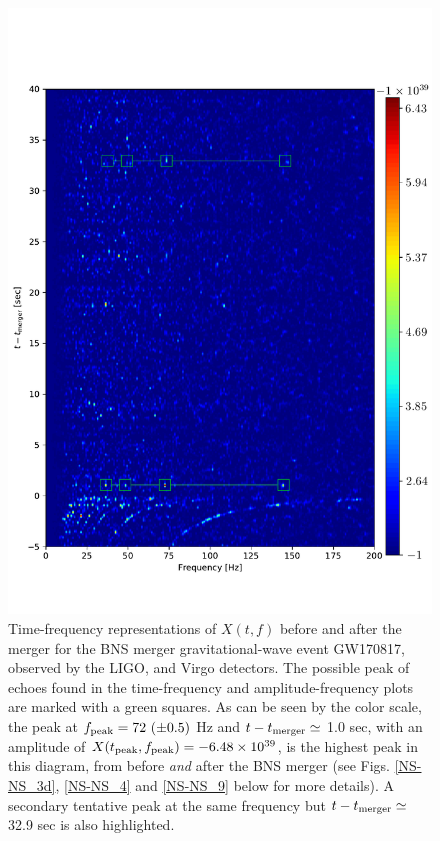 \documentclass[12pt]{article}
\begin{document}
\begin{figure}[!tbp]
    \includegraphics[width=\textwidth]{spectrogram_color.pdf}
 \caption{Time-frequency representations of $X(t,f)$ before and after the merger for the BNS merger gravitational-wave event GW170817, observed by the LIGO, and Virgo detectors. The possible peak of echoes found in the time-frequency and amplitude-frequency plots are marked with a green squares. As can be seen by the color scale, the peak at $f_{\rm{peak}}=72\ (\pm 0.5)$ Hz and $t-t_{\rm{merger}} \simeq $ 1.0 sec, with an amplitude of $X(t_{\rm{peak}},f_{\rm{peak}})=-6.48 \times 10^{39}$, is the highest peak in this diagram, from before {\it and} after the BNS merger (see Figs. \ref{NS-NS_3d}, \ref{NS-NS_4} and \ref{NS-NS_9} below for more details). A secondary tentative peak at the same frequency but $t-t_{\rm{merger}} \simeq $ 32.9 sec is also highlighted.}
 \label{NS-NS_11}
\end{figure}
\end{document}
